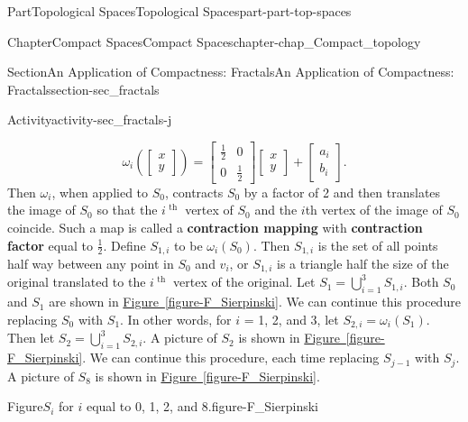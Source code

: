 \documentclass[oneside,10pt,]{book}
\newcommand{\xreffont}{\relax}
\newcommand{\terminology}[1]{\textbf{#1}}
\numberwithin{equation}{chapter}
\newcommand{\amp}{&}
\begin{document}
\begin{partptx}{Part}{Topological Spaces}{}{Topological Spaces}{}{}{part-part-top-spaces}
\begin{chapterptx}{Chapter}{Compact Spaces}{}{Compact Spaces}{}{}{chapter-chap_Compact_topology}
\begin{sectionptx}{Section}{An Application of Compactness: Fractals}{}{An Application of Compactness: Fractals}{}{}{section-sec_fractals}
\begin{activity}{Activity}{}{activity-sec_fractals-j}
\begin{enumerate}[font=\bfseries,label=(\alph*),ref=\alph*]
\begin{equation*}
\omega_i\left(\begin{bmatrix}x \\ y \end{bmatrix} \right) = \begin{bmatrix}\frac{1}{2} \amp  0 \\ 0 \amp  \frac{1}{2} \end{bmatrix} \begin{bmatrix}x \\ y \end{bmatrix}  + \begin{bmatrix}a_i \\ b_i \end{bmatrix}\text{.}
\end{equation*}
Then \(\omega_i\), when applied to \(S_0\), contracts \(S_0\) by a factor of 2 and then translates the image of \(S_0\) so that the \(i^{\text{ th } }\) vertex of \(S_0\) and the \(i\)th vertex of the image of \(S_0\) coincide. Such a map is called a \terminology{contraction mapping} with \terminology{contraction factor} equal to \(\frac{1}{2}\). Define \(S_{1,i}\) to be \(\omega_i(S_0)\). Then \(S_{1,i}\)  is the set of all points half way between any point in \(S_0\)  and  \(v_i\), or \(S_{1,i}\) is a triangle half the size of the original translated to the \(i^{\text{ th } }\) vertex of the original. Let \(S_1 = \bigcup_{i=1}^3 S_{1,i}\). Both \(S_0\) and \(S_1\) are shown in \hyperref[figure-F_Sierpinski]{Figure~{\xreffont\ref{figure-F_Sierpinski}}}. We can continue this procedure replacing \(S_0\) with \(S_1\). In other words, for \(i\) = 1, 2, and 3, let \(S_{2,i} = \omega_i(S_1)\). Then let \(S_2 = \bigcup_{i=1}^3 S_{2,i}\). A picture of \(S_2\) is shown in \hyperref[figure-F_Sierpinski]{Figure~{\xreffont\ref{figure-F_Sierpinski}}}. We can continue this procedure, each time replacing \(S_{j-1}\) with \(S_j\). A picture of \(S_8\) is shown in \hyperref[figure-F_Sierpinski]{Figure~{\xreffont\ref{figure-F_Sierpinski}}}.%
\begin{figureptx}{Figure}{\(S_i\) for \(i\) equal to 0, 1, 2, and 8.}{figure-F_Sierpinski}{}%
\centering
\begin{sidebyside}{2}{0}{0}{0}%
\begin{sbspanel}{0.5}%

\end{sbspanel}
\end{sidebyside}
\end{figureptx}
\end{enumerate}
\end{activity}
\end{sectionptx}
\end{chapterptx}
\end{partptx}
\end{document}
